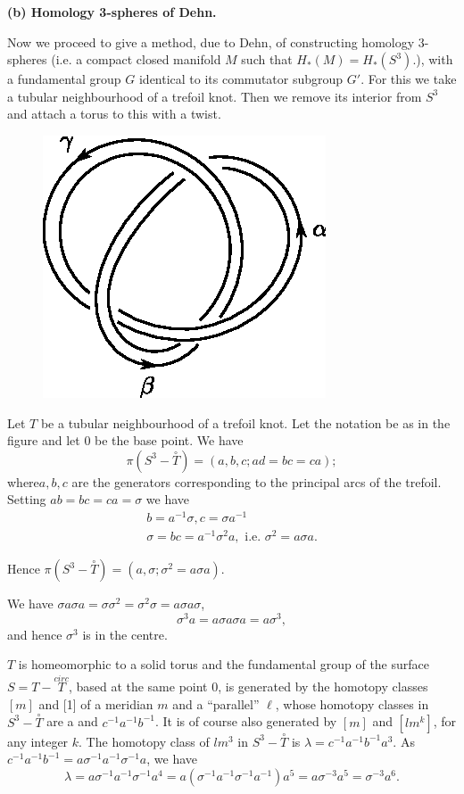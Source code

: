 \medskip
\noindent
\textbf{(b) Homology 3-spheres of Dehn.}

Now we proceed to give a method, due to Dehn, of constructing homology
3-spheres (i.e. a compact closed manifold $M$ such that $H_{\ast} (M) =
H_{\ast} (S^3)$.), with a fundamental group $G$ identical to its
commutator subgroup $G'$. For this we take a tubular neighbourhood of
a trefoil knot. Then we remove its interior from $S^3$ and attach a
torus to this with a twist. 
\begin{figure}[H]
\centering
\includegraphics{vol44-fig/fig44-17.eps}
\end{figure}
 
 Let $T$ be a tubular neighbourhood of a trefoil knot. Let the
 notation be as in the figure and let 0 be the base point. We have  
 $$
 \pi (S^3 -\overset{\circ}{T}) = (a, b, c; ad = bc = ca);
 $$
 where\pageoriginale $a, b, c$ are the generators corresponding to
 the principal arcs of the trefoil. Setting $ab = bc = ca = \sigma$
 we have   
 \begin{gather*}
b = a^{-1} \sigma, c = \sigma a^{-1}\\
\sigma = bc = a^{-1} \sigma^2 a, \text{ i.e. } \sigma^2 = a \sigma a.
 \end{gather*} 

Hence $ \pi (S^3 - \overset{\circ}{T}) = (a, \sigma ; \sigma^2 = a \sigma
a)$. 

We have $\sigma a \sigma a = \sigma \sigma^2 = \sigma^2 \sigma = a
\sigma a \sigma $, 
$$
\sigma^3 a = a \sigma a \sigma a = a \sigma^3, 
$$
and hence $\sigma^3$ is in the centre.

$T$ is homeomorphic to a solid torus and the fundamental group of the
surface $S = T - \overset{circ}{T}$, based at the same point 0, is
generated by the homotopy classes $[m]$ and [1] of a meridian $m$
and a ``parallel'' $\ell$, whose homotopy classes in $S^3 - \overset{\circ}{T}$
are a and $c^{-1} a^{-1} b^{-1}$. It is of course also generated by
$[m]$ and $[lm^k]$, for any integer $k$. The homotopy class of $lm^3$ 
in $S^3 - \overset{\circ}{T}$ is  $\lambda = c^{-1} a^{-1} b^{-1} a^3$. As
$c^{-1} a^{-1} b^{-1} = a \sigma^{-1} a^{-1} \sigma^{-1} a$, we have 
$$
\lambda = a \sigma^{-1} a^{-1} \sigma^{-1} a^4 = a (\sigma^{-1} a^{-1}
\sigma^{-1} a^{-1}) a^5 = a \sigma^{-3} a^5 = \sigma^{-3} a^6. 
$$

